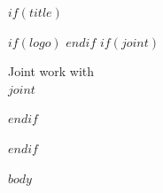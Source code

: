 \documentclass[table$if(handout)$,handout$endif$]{beamer}
\title$if(short-title)$[$short-title$]$endif${$title$}
\author{$for(author)$$author$$sep$ \and $endfor$}
\institute{$for(institute)$ $institute$ $sep$ \\ $endfor$}
\date{$date$}
\begin{document}
$if(title)$
\begin{frame}
  \titlepage
  $if(logo)$
  \UIlogo
  $endif$
  $if(joint)$
  \begin{center}
    \begin{small}
      Joint work with \\
      $joint$
    \end{small}
  \end{center}
  $endif$
\end{frame}
$endif$

$body$
\end{document}
